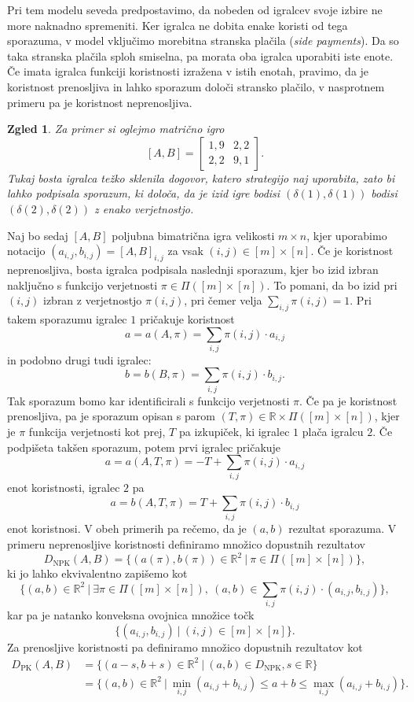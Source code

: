 \documentclass[10pt, a4paper]{article}
\newtheorem{zgled}[izr]{Zgled}
\newcommand{\R}{\mathbb {R}}
\begin{document}
Pri tem modelu seveda predpostavimo, da nobeden od igralcev svoje izbire ne more naknadno spremeniti.
Ker igralca ne dobita enake koristi od tega sporazuma, v model vključimo morebitna stranska plačila 
(\emph{side payments}). Da so taka stranska plačila sploh smiselna,
pa morata oba igralca uporabiti iste enote.
Če imata igralca funkciji koristnosti izražena v istih enotah,
pravimo, da je koristnost prenosljiva in lahko sporazum določi stransko plačilo,
v nasprotnem primeru pa je koristnost neprenosljiva.

\begin{zgled}
  Za primer si oglejmo matrično igro
  $$[A, B] = \begin{bmatrix}
    1,9 & 2,2\\
    2,2 & 9,1
  \end{bmatrix}.$$
  Tukaj bosta igralca težko sklenila dogovor, katero strategijo naj uporabita,
  zato bi lahko podpisala sporazum, ki določa, da je izid igre bodisi $(\delta(1), \delta(1))$
  bodisi $(\delta(2), \delta(2))$ z enako verjetnostjo.
\end{zgled}

Naj bo sedaj $[A, B]$ poljubna bimatrična igra velikosti $m \times n$, kjer 
uporabimo notacijo $(a_{i, j}, b_{i, j}) = [A, B]_{i, j}$ za vsak $(i, j) \in [m] \times [n]$.
Če je koristnost neprenosljiva, bosta igralca podpisala naslednji sporazum, kjer bo izid izbran naključno 
s funkcijo verjetnosti $\pi \in \Pi ([m] \times [n])$.
To pomani, da bo izid pri $(i, j)$ izbran z verjetnostjo $\pi(i, j)$,
pri čemer velja $\sum_{i, j} \pi (i, j) = 1.$
Pri takem sporazumu igralec $1$ pričakuje koristnost 
$$a = a(A, \pi) = \sum_{i, j} \pi(i, j) \cdot a_{i, j}$$
in podobno drugi tudi igralec:
$$b = b(B, \pi) = \sum_{i, j} \pi(i, j) \cdot b_{i, j}.$$
Tak sporazum bomo kar identificirali s funkcijo verjetnosti $\pi$.
Če pa je koristnost prenosljiva, pa je sporazum opisan s parom $(T, \pi) \in \R \times \Pi([m] \times [n])$,
kjer je $\pi$ funkcija verjetnosti kot prej, $T$ pa izkupiček, ki igralec $1$ plača igralcu $2$.
Če podpišeta takšen sporazum, potem prvi igralec pričakuje 
$$a = a(A, T, \pi) = -T + \sum_{i, j} \pi(i, j) \cdot a_{i, j}$$
enot koristnosti, igralec $2$ pa 
$$a = b(A, T, \pi) = T + \sum_{i, j} \pi(i, j) \cdot b_{i, j}$$
enot koristnosi. V obeh primerih pa rečemo, da je $(a, b)$ rezultat sporazuma.
V primeru neprenosljive koristnosti definiramo množico dopustnih rezultatov 
$$D_{\mathrm{NPK}} (A, B) = \{(a(\pi), b(\pi)) \in \R^2\ |\ \pi \in \Pi([m] \times [n])\},$$
ki jo lahko ekvivalentno zapišemo kot 
$$\{(a, b)\in \R^2\ |\ \exists \pi \in \Pi([m] \times [n]),\ (a, b) \in \sum_{i, j} \pi(i, j) \cdot (a_{i, j}, b_{i, j})\},$$
kar pa je natanko konveksna ovojnica množice točk 
$$\{(a_{i, j}, b_{i, j})\ |\ (i, j) \in [m] \times [n]\}.$$
Za prenosljive koristnosti pa definiramo množico dopustnih rezultatov kot 
\begin{align*}
  D_{\mathrm{PK}} (A, B) &= \{(a - s, b + s) \in \R^2\ |\ (a, b) \in D_{\mathrm{NPK}}, s \in \R\}\\
  &= \{(a, b) \in \R^2\ |\ \min_{i, j} (a_{i, j} + b_{i, j}) \leq a + b \leq \max_{i, j} (a_{i, j} + b_{i, j})\}.
\end{align*}
\end{document}
